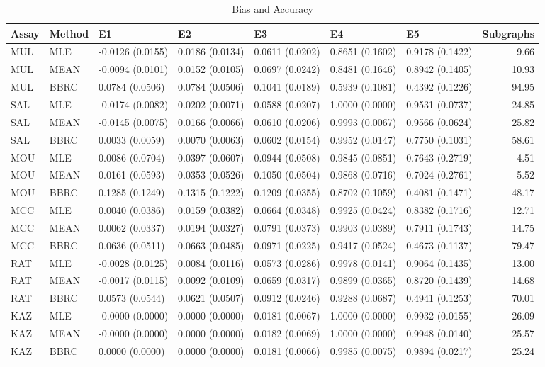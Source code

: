 \begin{table}[t]
\begin{center}
  {\small \begin{tabular}{lllllllr}
  \hline
 Assay & Method & E1 & E2 & E3 & E4 & E5 & Subgraphs \\ 
  \hline
  MUL & MLE & -0.0126 (0.0155) & 0.0186 (0.0134) & 0.0611 (0.0202) & 0.8651 (0.1602) & 0.9178 (0.1422) & 9.66 \\ 
  MUL & MEAN & -0.0094 (0.0101) & 0.0152 (0.0105) & 0.0697 (0.0242) & 0.8481 (0.1646) & 0.8942 (0.1405) & 10.93 \\ 
  MUL & BBRC & 0.0784 (0.0506) & 0.0784 (0.0506) & 0.1041 (0.0189) & 0.5939 (0.1081) & 0.4392 (0.1226) & 94.95 \\ 
  SAL & MLE & -0.0174 (0.0082) & 0.0202 (0.0071) & 0.0588 (0.0207) & 1.0000 (0.0000) & 0.9531 (0.0737) & 24.85 \\ 
  SAL & MEAN & -0.0145 (0.0075) & 0.0166 (0.0066) & 0.0610 (0.0206) & 0.9993 (0.0067) & 0.9566 (0.0624) & 25.82 \\ 
  SAL & BBRC & 0.0033 (0.0059) & 0.0070 (0.0063) & 0.0602 (0.0154) & 0.9952 (0.0147) & 0.7750 (0.1031) & 58.61 \\ 
  MOU & MLE & 0.0086 (0.0704) & 0.0397 (0.0607) & 0.0944 (0.0508) & 0.9845 (0.0851) & 0.7643 (0.2719) & 4.51 \\ 
  MOU & MEAN & 0.0161 (0.0593) & 0.0353 (0.0526) & 0.1050 (0.0504) & 0.9868 (0.0716) & 0.7024 (0.2761) & 5.52 \\ 
  MOU & BBRC & 0.1285 (0.1249) & 0.1315 (0.1222) & 0.1209 (0.0355) & 0.8702 (0.1059) & 0.4081 (0.1471) & 48.17 \\ 
  MCC & MLE & 0.0040 (0.0386) & 0.0159 (0.0382) & 0.0664 (0.0348) & 0.9925 (0.0424) & 0.8382 (0.1716) & 12.71 \\ 
  MCC & MEAN & 0.0062 (0.0337) & 0.0194 (0.0327) & 0.0791 (0.0373) & 0.9903 (0.0389) & 0.7911 (0.1743) & 14.75 \\ 
  MCC & BBRC & 0.0636 (0.0511) & 0.0663 (0.0485) & 0.0971 (0.0225) & 0.9417 (0.0524) & 0.4673 (0.1137) & 79.47 \\ 
  RAT & MLE & -0.0028 (0.0125) & 0.0084 (0.0116) & 0.0573 (0.0286) & 0.9978 (0.0141) & 0.9064 (0.1435) & 13.00 \\ 
  RAT & MEAN & -0.0017 (0.0115) & 0.0092 (0.0109) & 0.0659 (0.0317) & 0.9899 (0.0365) & 0.8720 (0.1439) & 14.68 \\ 
  RAT & BBRC & 0.0573 (0.0544) & 0.0621 (0.0507) & 0.0912 (0.0246) & 0.9288 (0.0687) & 0.4941 (0.1253) & 70.01 \\ 
  KAZ & MLE & -0.0000 (0.0000) & 0.0000 (0.0000) & 0.0181 (0.0067) & 1.0000 (0.0000) & 0.9932 (0.0155) & 26.09 \\ 
  KAZ & MEAN & -0.0000 (0.0000) & 0.0000 (0.0000) & 0.0182 (0.0069) & 1.0000 (0.0000) & 0.9948 (0.0140) & 25.57 \\ 
  KAZ & BBRC & 0.0000 (0.0000) & 0.0000 (0.0000) & 0.0181 (0.0066) & 0.9985 (0.0075) & 0.9894 (0.0217) & 25.24 \\ 
   \hline
 \end{tabular} }
\caption{Bias and Accuracy}
\label{t:anal}
\end{center}
\end{table}
